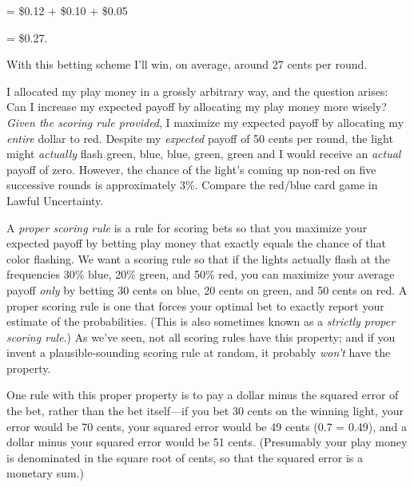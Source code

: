 \bigskip

{\centering
 = \$0.12 + \$0.10 + \$0.05
\par}


\bigskip

{\centering
 = \$0.27.
\par}


\bigskip

{
 With this betting scheme I'll win, on average,
around 27 cents per round.}

{
 I allocated my play money in a grossly arbitrary way, and the
question arises: Can I increase my expected payoff by allocating my
play money more wisely? \textit{Given the scoring rule provided}, I
maximize my expected payoff by allocating my \textit{entire} dollar to
red. Despite my \textit{expected} payoff of 50 cents per round, the
light might \textit{actually} flash green, blue, blue, green, green and
I would receive an \textit{actual} payoff of zero. However, the chance
of the light's coming up non-red on five successive
rounds is approximately 3\%. Compare the red/blue card game in Lawful
Uncertainty.}

{
 A \textit{proper scoring rule} is a rule for scoring bets so that
you maximize your expected payoff by betting play money that exactly
equals the chance of that color flashing. We want a scoring rule so
that if the lights actually flash at the frequencies 30\% blue, 20\%
green, and 50\% red, you can maximize your average payoff \textit{only}
by betting 30 cents on blue, 20 cents on green, and 50 cents on red. A
proper scoring rule is one that forces your optimal bet to exactly
report your estimate of the probabilities. (This is also sometimes
known as a \textit{strictly proper scoring rule}.) As
we've seen, not all scoring rules have this property;
and if you invent a plausible-sounding scoring rule at random, it
probably \textit{won't} have the property.}

{
 One rule with this proper property is to pay a dollar minus the
squared error of the bet, rather than the bet itself---if you bet 30
cents on the winning light, your error would be 70 cents, your squared
error would be 49 cents (0.7 = 0.49), and a dollar
minus your squared error would be 51 cents.
(Presumably your play money is denominated in the square root of cents,
so that the squared error is a monetary sum.)}

